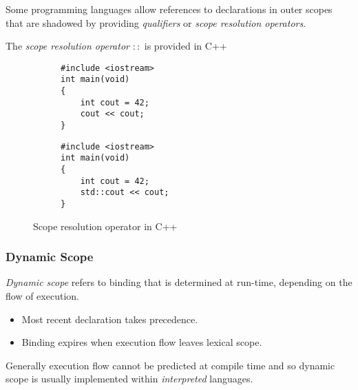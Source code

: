 \begin{definition}[Qualifier]
    Some programming languages allow references to declarations in outer scopes that are shadowed by providing \textit{qualifiers} or \textit{scope resolution operators}.
\end{definition}

\begin{example}
    The \textit{scope resolution operator} $::$ is provided in C++
    \begin{figure}[H]
        \centering
        \begin{subfigure}{0.45\textwidth}
            \centering
            \begin{verbatim}
#include <iostream>
int main(void)
{
    int cout = 42;
    cout << cout;
}
            \end{verbatim}
        \end{subfigure}
        \begin{subfigure}{0.45\textwidth}
            \centering
            \begin{verbatim}
#include <iostream>
int main(void)
{
    int cout = 42;
    std::cout << cout;
}
            \end{verbatim}
        \end{subfigure}
        \caption{Scope resolution operator in C++}
        \label{fig:cpp-scope-resolution-operator}
    \end{figure}
\end{example}

\subsubsection{Dynamic Scope}

\begin{definition}
    \textit{Dynamic scope} refers to binding that is determined at run-time, depending on the flow of execution.
    \begin{itemize}
        \item Most recent declaration takes precedence.
        \item Binding expires when execution flow leaves lexical scope.
    \end{itemize}
    
    Generally execution flow cannot be predicted at compile time and so dynamic scope is usually implemented within \textit{interpreted} languages.
\end{definition}

